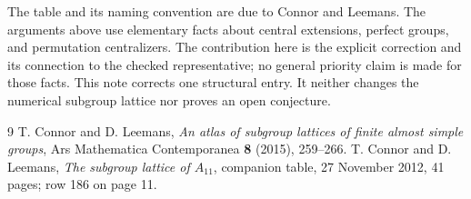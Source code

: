 \documentclass[11pt]{article}
\begin{document}
The table and its naming convention are due to Connor and Leemans.
The arguments above use elementary facts about central extensions,
perfect groups, and permutation centralizers. The contribution here is
the explicit correction and its connection to the checked representative;
no general priority claim is made for those facts. This note corrects
one structural entry. It neither changes the numerical subgroup lattice
nor proves an open conjecture.

\begin{thebibliography}{9}
 T. Connor and D. Leemans,
\emph{An atlas of subgroup lattices of finite almost simple groups},
Ars Mathematica Contemporanea \textbf{8} (2015), 259--266.
 T. Connor and D. Leemans,
\emph{The subgroup lattice of $A_{11}$}, companion table,
27 November 2012, 41 pages; row 186 on page 11.
\end{thebibliography}
\end{document}
